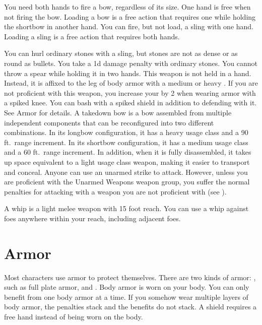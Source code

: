          You need both hands to fire a bow, regardless of its size. One hand is free when not firing the bow. Loading a bow is a free action that requires one  while holding the shortbow in another hand.
         You can fire, but not load, a sling with one hand. Loading a sling is a free action that requires both hands.
        \par You can hurl ordinary stones with a sling, but stones are not as dense or as round as bullets. You take a \minus1d damage penalty with ordinary stones.
         You cannot throw a spear while holding it in two hands.
         This weapon is not held in a hand.
        Instead, it is affixed to the leg of body armor with a medium or heavy .
        If you are not proficient with this weapon, you increase your  by 2 when wearing armor with a spiked knee.
         You can bash with a spiked shield in addition to defending with it. See Armor for details.
         A takedown bow is a bow assembled from multiple independent components that can be reconfigured into two different combinations.
        In its longbow configuration, it has a heavy usage class and a 90 ft.\ range increment.
        In its shortbow configuration, it has a medium usage class and a 60 ft.\ range increment.
        In addition, when it is fully disassembled, it takes up space equivalent to a light usage class weapon, making it easier to transport and conceal.
         Anyone can use an unarmed strike to attack.
        However, unless you are proficient with the Unarmed Weapons weapon group, you suffer the normal penalties for attacking with a weapon you are not proficient with (see ).

         A whip is a light melee weapon with 15 foot reach.
        You can use a whip against foes anywhere within your reach, including adjacent foes.

\section{Armor}\label{Armor}

    Most characters use armor to protect themselves. There are two kinds of armor: , such as full plate armor, and .
    Body armor is worn on your body.
    You can only benefit from one body armor at a time.
    If you somehow wear multiple layers of body armor, the penalties stack and the benefits do not stack.
    A shield requires a free hand instead of being worn on the body.

